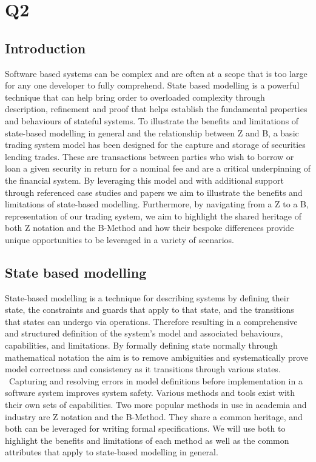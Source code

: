 \documentclass{article}
\begin{document}
\section*{Q2}

\subsection*{Introduction}

Software based systems can be complex and are often at a scope that is too large for any one developer to fully comprehend. State based modelling is a powerful technique that can help bring order to overloaded complexity through description, refinement and proof that helps establish the fundamental properties and behaviours of stateful systems.
\newline \newline
To illustrate the benefits and limitations of state-based modelling in general and the relationship between Z and B, a basic trading system model has been designed for the capture and storage of securities lending trades. These are transactions between parties who wish to borrow or loan a given security in return for a nominal fee and are a critical underpinning of the financial system.
\newline \newline
By leveraging this model and with additional support through referenced case studies and papers we aim to illustrate the benefits and limitations of state-based modelling. Furthermore, by navigating from a Z to a B, representation of our trading system, we aim to highlight the shared heritage of both Z notation and the B-Method and how their bespoke differences provide unique opportunities to be leveraged in a variety of scenarios.

\subsection*{State based modelling}

State-based modelling is a technique for describing systems by defining their state, the constraints and guards that apply to that state, and the transitions that states can undergo via operations. Therefore resulting in a comprehensive and structured definition of the system's model and associated behaviours, capabilities, and limitations.
\newline \newline
By formally defining state normally through mathematical notation the aim is to remove ambiguities and systematically prove model correctness and consistency as it transitions through various states.  Capturing and resolving errors in model definitions before implementation in a software system improves system safety.
\newline \newline
Various methods and tools exist with their own sets of capabilities. Two more popular methods in use in academia and industry are Z notation and the B-Method. They share a common heritage, and both can be leveraged for writing formal specifications. We will use both to highlight the benefits and limitations of each method as well as the common attributes that apply to state-based modelling in general.
\end{document}
